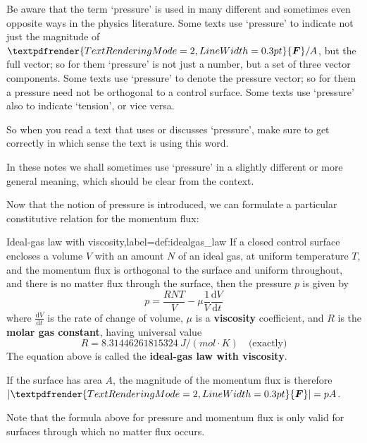 \documentclass[a4paper,12pt,%
onecolumn,oneside,titlepage,%
british%
]{memoir}
\providecommand{\href}[2]{#2}
\renewcommand*{\bm}[1]{\textpdfrender{TextRenderingMode=2,LineWidth=0.3pt}{\boldsymbol{#1}}}
\newcommand*{\di}{\mathrm{d}}%
\DeclarePairedDelimiter\abs{\lvert}{\rvert}
\renewcommand*{\|}[1][]{\nonscript\:#1\vert\nonscript\:\mathopen{}}
\newcommand*{\furl}[2]{\href{#1}{#2}\pagenote{\url{#1}}}
\newcommand*{\yvis}{\mu} %
\newcommand*{\yN}{N}
\newcommand*{\yF}{\bm{F}}
\newcommand*{\ypr}{p} %
\newcommand*{\yT}{T}%
\begin{document}
\begin{warning}
  Be aware that the term \enquote*{pressure} is used in many different and sometimes even opposite ways in the physics literature. Some texts use \enquote*{pressure} to indicate not just the magnitude of $\yF/A$, but the full vector; so for them \enquote*{pressure} is not just a number, but a set of three vector components. Some texts use \enquote*{pressure} to denote the pressure vector; so for them a pressure need not be orthogonal to a control surface. Some texts use \enquote*{pressure} also to indicate \enquote*{tension}, or vice versa.

  So when you read a text that uses or discusses \enquote*{pressure}, make sure to get correctly in which sense the text is using this word.

  In these notes we shall sometimes use \enquote*{pressure} in a slightly different or more general meaning, which should be clear from the context.
\end{warning}


Now that the notion of pressure is introduced, we can formulate a particular constitutive relation for the momentum flux:

\begin{definition}{Ideal-gas law with viscosity,label={def:idealgas_law}}
  If a closed control surface encloses a volume $V$ with an amount $\yN$ of an ideal gas, at uniform temperature $\yT$, and the momentum flux is orthogonal to the surface and uniform throughout, and there is no matter flux through the surface, then the pressure $\ypr$ is given by
  \begin{equation}
    \label{eq:ideal_gas_p}
    \ypr = \frac{R \yN \yT}{V}  - \yvis \frac{1}{V}\frac{\di V}{\di t}
  \end{equation}
  where $\frac{\di V}{\di t}$ is the rate of change of volume, $\yvis$ is a \textbf{viscosity} coefficient, and $R$ is the \furl{https://doi.org/10.1351/goldbook.G02579}{\textbf{molar gas constant}}, having universal value
  \begin{equation*}
    R = \qty{8.31446261815324}{J/(mol\cdot K)}\quad\text{(exactly)}
  \end{equation*}
The equation above is called the \textbf{ideal-gas law with viscosity}.

  \smallskip

  If the surface has area $A$, the magnitude of the momentum flux is therefore $\abs{\yF} = \ypr A$.

\end{definition}
Note that the formula above for pressure and momentum flux is only valid for surfaces through which no matter flux occurs.
\end{document}
